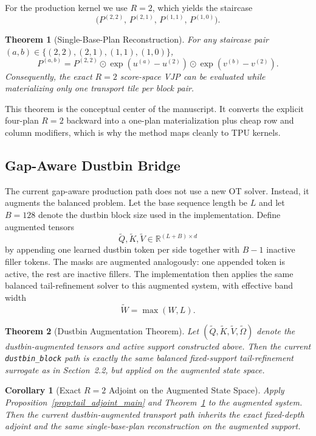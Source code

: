 \documentclass{article}
\newtheorem{theorem}{Theorem}
\newtheorem{corollary}{Corollary}
\begin{document}
For the production kernel we use $R=2$, which yields the staircase
\[
\bigl(P^{(2,2)},\,P^{(2,1)},\,P^{(1,1)},\,P^{(1,0)}\bigr).
\]

\begin{theorem}[Single-Base-Plan Reconstruction]\label{thm:single_base_main}
For any staircase pair $(a,b)\in\{(2,2),(2,1),(1,1),(1,0)\}$,
\[
P^{(a,b)}
=
P^{(2,2)}
\odot
\exp(u^{(a)}-u^{(2)})
\odot
\exp(v^{(b)}-v^{(2)}).
\]
Consequently, the exact $R=2$ score-space VJP can be evaluated while materializing only one transport tile per block pair.
\end{theorem}

This theorem is the conceptual center of the manuscript. It converts the explicit four-plan $R=2$ backward into a one-plan materialization plus cheap row and column modifiers, which is why the method maps cleanly to TPU kernels.

\subsection{Gap-Aware Dustbin Bridge}

The current gap-aware production path does not use a new OT solver. Instead, it augments the balanced problem. Let the base sequence length be $L$ and let $B=128$ denote the dustbin block size used in the implementation. Define augmented tensors
\[
\widetilde Q,\widetilde K,\widetilde V \in \mathbb{R}^{(L+B)\times d}
\]
by appending one learned dustbin token per side together with $B-1$ inactive filler tokens. The masks are augmented analogously: one appended token is active, the rest are inactive fillers. The implementation then applies the same balanced tail-refinement solver to this augmented system, with effective band width
\[
\widetilde W = \max(W,L).
\]

\begin{theorem}[Dustbin Augmentation Theorem]\label{thm:dustbin_aug}
Let $(\widetilde Q,\widetilde K,\widetilde V,\widetilde\Omega)$ denote the dustbin-augmented tensors and active support constructed above. Then the current \texttt{dustbin\_block} path is exactly the same balanced fixed-support tail-refinement surrogate as in Section~2.2, but applied on the augmented state space.
\end{theorem}

\begin{corollary}[Exact \texorpdfstring{$R=2$}{R=2} Adjoint on the Augmented State Space]\label{cor:dustbin_r2}
Apply Proposition~\ref{prop:tail_adjoint_main} and Theorem~\ref{thm:single_base_main} to the augmented system. Then the current dustbin-augmented transport path inherits the exact fixed-depth adjoint and the same single-base-plan reconstruction on the augmented support.
\end{corollary}
\end{document}
